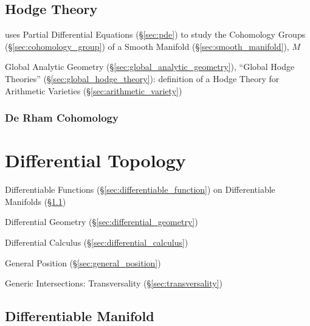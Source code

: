 \subsection{Hodge Theory}\label{sec:hodge_theory}

uses Partial Differential Equations (\S\ref{sec:pde}) to study the Cohomology
Groups (\S\ref{sec:cohomology_group}) of a Smooth Manifold
(\S\ref{sec:smooth_manifold}), $M$

\fist Global Analytic Geometry (\S\ref{sec:global_analytic_geometry}), ``Global
Hodge Theories'' (\S\ref{sec:global_hodge_theory}): definition of a Hodge
Theory for Arithmetic Varieties (\S\ref{sec:arithmetic_variety})



\subsubsection{De Rham Cohomology}\label{sec:derham_cohomology}



\section{Differential Topology}\label{sec:differential_topology}

Differentiable Functions (\S\ref{sec:differentiable_function}) on Differentiable
Manifolds (\S\ref{sec:differentiable_manifold})

\fist Differential Geometry (\S\ref{sec:differential_geometry})

\fist Differential Calculus (\S\ref{sec:differential_calculus})

General Position (\S\ref{sec:general_position})

Generic Intersections: Transversality (\S\ref{sec:transversality})



\subsection{Differentiable Manifold}\label{sec:differentiable_manifold}

